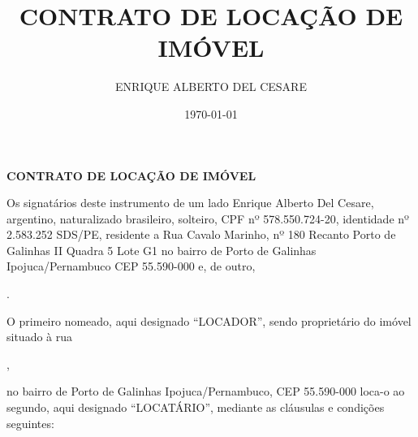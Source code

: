 \documentclass[a4paper,12pt]{article}
\date{\today}
\author{ENRIQUE ALBERTO DEL CESARE}
\title{CONTRATO DE LOCAÇÃO DE IMÓVEL}
\begin{document}
\thispagestyle{empty}
\begin{center}{\bf \huge CONTRATO DE LOCAÇÃO DE IMÓVEL}\\[5.1cm] \end{center} 
\newcommand\n{\newcommand}


Os signatários deste instrumento de um lado Enrique Alberto Del Cesare,
argentino, naturalizado brasileiro, solteiro, CPF nº 578.550.724-20, identidade nº 2.583.252 SDS\//PE, 
residente a Rua Cavalo Marinho, nº 180 Recanto Porto de Galinhas II Quadra 5 Lote G1 
no bairro de Porto de Galinhas Ipojuca/Pernambuco CEP 55.590-000 e, de outro,
\hrulefill

\noindent \hrulefill.

O primeiro nomeado, aqui designado “LOCADOR”, sendo proprietário do imóvel situado à rua \hrulefill
 
\noindent \hrulefill, 

\noindent no bairro de Porto de Galinhas Ipojuca\//Pernambuco, CEP 55.590-000 loca-o ao segundo, aqui designado “LOCATÁRIO”, mediante as cláusulas e condições seguintes:
\end{document}
